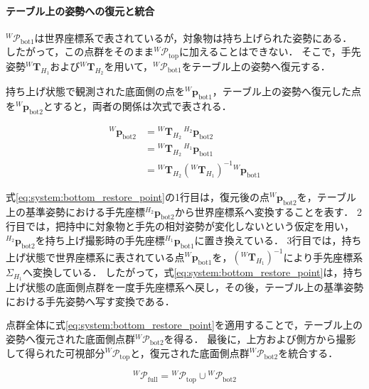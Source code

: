 \paragraph{テーブル上の姿勢への復元と統合}
${}^{W}\mathcal{P}_{\mathrm{bot1}}$は世界座標系で表されているが，対象物は持ち上げられた姿勢にある．
したがって，この点群をそのまま${}^{W}\mathcal{P}_{\mathrm{top}}$に加えることはできない．
そこで，手先姿勢${}^{W}\bm{T}_{H_1}$および${}^{W}\bm{T}_{H_2}$を用いて，${}^{W}\mathcal{P}_{\mathrm{bot1}}$をテーブル上の姿勢へ復元する．

持ち上げ状態で観測された底面側の点を${}^{W}\bm{p}_{\mathrm{bot1}}$，テーブル上の姿勢へ復元した点を${}^{W}\bm{p}_{\mathrm{bot2}}$とすると，両者の関係は次式で表される．

\begin{equation}
\begin{aligned}
  {}^{W}\bm{p}_{\mathrm{bot2}}
  &=
  {}^{W}\bm{T}_{H_2}
  \,
  {}^{H_2}\bm{p}_{\mathrm{bot2}}
  \\
  &=
  {}^{W}\bm{T}_{H_2}
  \,
  {}^{H_1}\bm{p}_{\mathrm{bot1}}
  \\
  &=
  {}^{W}\bm{T}_{H_2}
  \left(
    {}^{W}\bm{T}_{H_1}
  \right)^{-1}
  {}^{W}\bm{p}_{\mathrm{bot1}}
\end{aligned}
\label{eq:system:bottom_restore_point}
\end{equation}

式\eqref{eq:system:bottom_restore_point}の1行目は，復元後の点${}^{W}\bm{p}_{\mathrm{bot2}}$を，テーブル上の基準姿勢における手先座標${}^{H_2}\bm{p}_{\mathrm{bot2}}$から世界座標系へ変換することを表す．
2行目では，把持中に対象物と手先の相対姿勢が変化しないという仮定を用い，${}^{H_2}\bm{p}_{\mathrm{bot2}}$を持ち上げ撮影時の手先座標${}^{H_1}\bm{p}_{\mathrm{bot1}}$に置き換えている．
3行目では，持ち上げ状態で世界座標系に表されている点${}^{W}\bm{p}_{\mathrm{bot1}}$を，$\left({}^{W}\bm{T}_{H_1}\right)^{-1}$により手先座標系$\Sigma_{H_1}$へ変換している．
したがって，式\eqref{eq:system:bottom_restore_point}は，持ち上げ状態の底面側点群を一度手先座標系へ戻し，その後，テーブル上の基準姿勢における手先姿勢へ写す変換である．

点群全体に式\eqref{eq:system:bottom_restore_point}を適用することで，テーブル上の姿勢へ復元された底面側点群${}^{W}\mathcal{P}_{\mathrm{bot2}}$を得る．
最後に，上方および側方から撮影して得られた可視部分${}^{W}\mathcal{P}_{\mathrm{top}}$と，復元された底面側点群${}^{W}\mathcal{P}_{\mathrm{bot2}}$を統合する．

\begin{equation}
  {}^{W}\mathcal{P}_{\mathrm{full}}
  =
  {}^{W}\mathcal{P}_{\mathrm{top}}
  \cup
  {}^{W}\mathcal{P}_{\mathrm{bot2}}
  \label{eq:system:bottom_full_cloud}
\end{equation}

